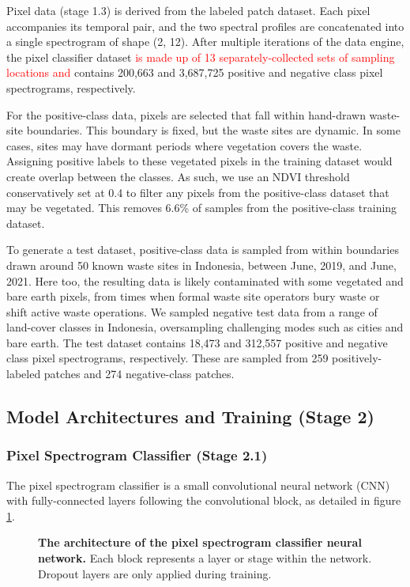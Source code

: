 \documentclass[10pt,letterpaper]{article}
\begin{document}
Pixel data (stage 1.3) is derived from the labeled patch dataset. Each pixel accompanies its temporal pair, and the two spectral profiles are concatenated into a single spectrogram of shape (2, 12). After multiple iterations of the data engine, the pixel classifier dataset \textcolor{red}{is made up of 13 separately-collected sets of sampling locations and} contains 200,663 and 3,687,725 positive and negative class pixel spectrograms, respectively.

For the positive-class data, pixels are selected that fall within hand-drawn waste-site boundaries. This boundary is fixed, but the waste sites are dynamic. In some cases, sites may have dormant periods where vegetation covers the waste. Assigning positive labels to these vegetated pixels in the training dataset would create overlap between the classes. As such, we use an NDVI threshold conservatively set at 0.4 to filter any pixels from the positive-class dataset that may be vegetated. This removes 6.6\% of samples from the positive-class training dataset.

To generate a test dataset, positive-class data is sampled from within boundaries drawn around 50 known waste sites in Indonesia, between June, 2019, and June, 2021. Here too, the resulting data is likely contaminated with some vegetated and bare earth pixels, from times when formal waste site operators bury waste or shift active waste operations. We sampled negative test data from a range of land-cover classes in Indonesia, oversampling challenging modes such as cities and bare earth. The test dataset contains 18,473 and 312,557 positive and negative class pixel spectrograms, respectively. These are sampled from 259 positively-labeled patches and 274 negative-class patches.

\subsection*{Model Architectures and Training (Stage 2)}
\subsubsection*{Pixel Spectrogram Classifier (Stage 2.1)}
The pixel spectrogram classifier is a small convolutional neural network (CNN) with fully-connected layers following the convolutional block, as detailed in figure \ref{fig:pixel_architecture}.

\begin{figure}[!h]
    \caption{{\bf The architecture of the pixel spectrogram classifier neural network.}
    Each block represents a layer or stage within the network. Dropout layers are only applied during training.}
    \label{fig:pixel_architecture}
\end{figure}
\end{document}
